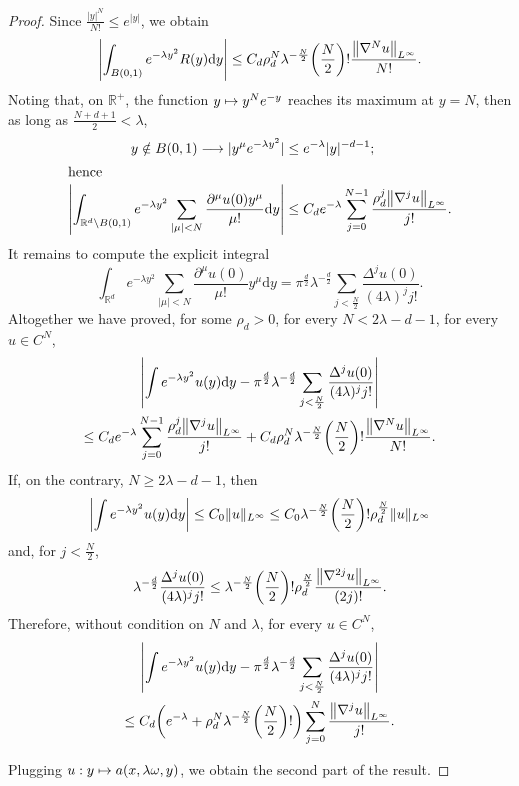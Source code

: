 \documentclass[AHL,Unicode,longabstracts,published]{cedram}
\newcommand\1{\mathds{1}}
\newcommand{\R}{\mathbb{R}}
\newcommand{\dd}{\mathrm{d}}
\renewcommand*{\to}{\mathchoice{\longrightarrow}{\rightarrow}{\rightarrow}{\rightarrow}}
\let\oldmapsto\mapsto
\renewcommand*{\mapsto}{\mathchoice{\longmapsto}{\oldmapsto}{\oldmapsto}{\oldmapsto}}
\let\originalleft\left
\let\originalright\right
\renewcommand{\left}{\mathopen{}\mathclose\bgroup\originalleft}
\renewcommand{\right}{\aftergroup\egroup\originalright}
\begin{document}
\begin{proof}
Since $\frac{|y|^N}{N!}\leq e^{|y|}$, we obtain
\[
\left| \int_{B(0,1)}e^{-\lambda y^2}R(y)\dd y\right|\leq C_d\rho_d^N\lambda^{-\frac{N}{2}} \left(\frac{N}{2}\right)!\frac{\left\|\nabla^Nu\right\|_{L^{\infty}}}{N!}.
\]
Noting that, on $\R^+$, the function $y\mapsto y^Ne^{-y}$ reaches its maximum at $y=N$, then as long as $\frac{N+d+1}{2}<\lambda$,
\begin{align*}
y\notin B(0,1)\to |y^{\mu}e^{-\lambda y^2}| &\leq e^{-\lambda}|y|^{-d-1};
\\
\intertext{hence}
\left|\int_{\R^d\setminus B(0,1)}e^{-\lambda y^2}\sum_{|\mu|<N}\frac{\partial^\mu u(0)y^{\mu}}{\mu!}\dd y\right| &\leq C_de^{-\lambda}\sum_{j=0}^{N-1}\frac{\rho_d^j\left\|\nabla^ju\right\|_{L^{\infty}}}{j!}.
\end{align*}
It remains to compute the explicit integral
\[
\int_{\R^d}e^{-\lambda y^2}\sum_{|\mu|<N}\frac{\partial^\mu u(0)}{\mu!}y^{\mu}\dd y=\pi^{\frac d2}\lambda^{-\frac d2}\sum_{j<\frac{N}{2}}\frac{\Delta^ju(0)}{(4\lambda)^jj!}.
\]
Altogether we have proved, for some $\rho_d>0$, for every $N<2\lambda-d-1$, for every $u\in C^N$,
\begin{multline*}
\left|\int e^{-\lambda y^2}u(y)\dd y-\pi^{\frac d2}\lambda^{-\frac d2}\sum_{j<
\frac{N}{2}}\frac{\Delta^ju(0)}{(4\lambda)^jj!}\right|\\
\leq C_de^{-\lambda}\sum_{j=0}^{N-1}\frac{\rho_d^j\left\|\nabla^ju\right\|_{L^{\infty}}}{j!}+C_d\rho_d^N\lambda^{-\frac N2}\left(\frac N2\right)!\frac{\left\|\nabla^Nu\right\|_{L^{\infty}}}{N!}.
\end{multline*}
If, on the contrary, $N\geq 2\lambda-d-1$, then
\[
\left|\int e^{-\lambda y^2}u(y)\dd y\right|\leq C_0\|u\|_{L^{\infty}}\leq C_0\lambda^{-\frac N2}\left(\frac N2\right)!\rho_d^{\frac N2}\|u\|_{L^{\infty}}
\]
and, for $j<\frac N2$,
\[
\lambda^{-\frac d2}\frac{\Delta^ju(0)}{(4\lambda)^jj!}\leq
\lambda^{-\frac N2}\left(\frac N2\right)!\rho_d^{\frac N2}\frac{\left\|\nabla^{2j}u\right\|_{L^{\infty}}}{(2j)!}.
\]
Therefore, without condition on $N$ and $\lambda$, for every $u\in C^N$,
\begin{multline}\label{eq:stat_phase_fixed_order}
\left|\int e^{-\lambda y^2}u(y)\dd y-\pi^{\frac d2}\lambda^{-\frac d2}\sum_{j<
\frac{N}{2}}\frac{\Delta^ju(0)}{(4\lambda)^jj!}\right|\\
\leq C_d\left(e^{-\lambda}+\rho_d^N\lambda^{-\frac N2}\left(\frac N2\right)!\right)\sum_{j=0}^N\frac{\left\|\nabla^ju\right\|_{L^{\infty}}}{j!}.
\end{multline}

Plugging $u:y\mapsto a(x,\lambda \omega,y)$, we obtain the second part of the result.


\end{proof}
\end{document}
